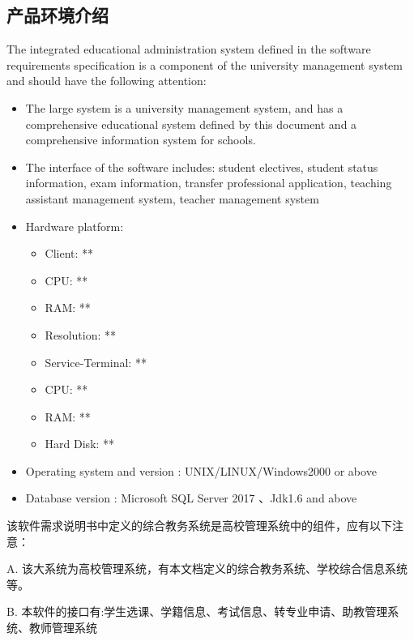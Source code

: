 \subsection{产品环境介绍}
The integrated educational administration system defined in the software requirements specification is a component of the university management system and should have the following attention:
\begin{itemize}
\item The large system is a university management system, and has a comprehensive educational system defined by this document and a comprehensive information system for schools.
\item The interface of the software includes: student electives, student status information, exam information, transfer professional application, teaching assistant management system, teacher management system
\item Hardware platform:
\begin{itemize}
\item Client: **
\item CPU: **
\item RAM: **
\item Resolution: **
\item Service-Terminal: **
\item CPU: **
\item RAM: **
\item Hard Disk: **
\end{itemize}
\item Operating system and version : UNIX/LINUX/Windows2000 or above
\item Database version : Microsoft SQL Server 2017 、Jdk1.6 and above
\end{itemize}


该软件需求说明书中定义的综合教务系统是高校管理系统中的组件，应有以下注意：

	A. 该大系统为高校管理系统，有本文档定义的综合教务系统、学校综合信息系统等。

	B. 本软件的接口有:学生选课、学籍信息、考试信息、转专业申请、助教管理系统、教师管理系统
    	
